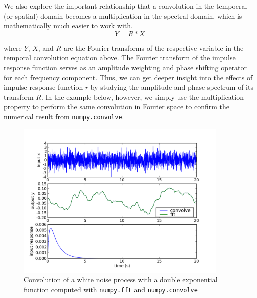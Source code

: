 We also explore the important relationship that a convolution in the
tempoeral (or spatial) domain becomes a multiplication in the spectral
domain, which is mathematically much easier to work with.  
\[
Y = R*X
\] 

where $Y$, $X$, and $R$ are the Fourier transforms of the respective
variable in the temporal convolution equation above.  The Fourier
transform of the impulse response function serves as an amplitude
weighting and phase shifting operator for each frequency component.
Thus, we can get deeper insight into the effects of impulse response
function $r$ by studying the amplitude and phase spectrum of its
transform $R$.  In the example below, however, we simply use the
multiplication property to perform the same convolution in Fourier
space to confirm the numerical result from \texttt{numpy.convolve}.





\begin{center}%
\begin{figure}
\begin{centering}\includegraphics[width=4in]{fig/convolution_demo}\par\end{centering}
\caption{\label{fig:convolution_demo}Convolution of a white noise process with a double exponential function computed with \texttt{numpy.fft} and \texttt{numpy.convolve}}
\end{figure}
\par\end{center}
